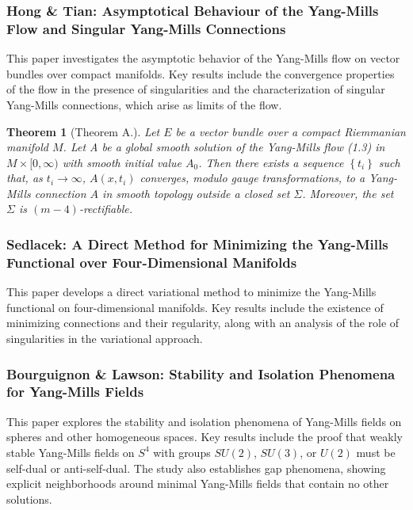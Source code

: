 \documentclass[10pt, letterpaper]{article}
\theoremstyle{custom}
\newtheorem{theorem}{Theorem}[section]
\theoremstyle{definition}
\begin{document}
\subsubsection{Hong \& Tian: Asymptotical Behaviour of the Yang-Mills Flow and Singular Yang-Mills Connections \cite{hongtian2004yangmills}} 
This paper investigates the asymptotic behavior of the Yang-Mills flow on vector bundles over compact manifolds. Key results include the convergence properties of the flow in the presence of singularities and the characterization of singular Yang-Mills connections, which arise as limits of the flow.


\begin{theorem}[Theorem A.]
    Let $E$ be a vector bundle over a compact Riemmanian manifold $M$. Let A be a global smooth solution of the Yang-Mills flow (1.3) in $M \times[0, \infty)$ with smooth initial value $A_0$. Then there exists a sequence $\left\{t_i\right\}$ such that, as $t_i \rightarrow \infty$, $A\left(x, t_i\right)$ converges, modulo gauge transformations, to a Yang-Mills connection $A$ in smooth topology outside a closed set $\Sigma$. Moreover, the set $\Sigma$ is $(m-4)$-rectifiable.
\end{theorem}



\subsubsection{Sedlacek: A Direct Method for Minimizing the Yang-Mills Functional over Four-Dimensional Manifolds \cite{sedlacek1982direct}} 
This paper develops a direct variational method to minimize the Yang-Mills functional on four-dimensional manifolds. Key results include the existence of minimizing connections and their regularity, along with an analysis of the role of singularities in the variational approach.


\subsubsection{Bourguignon \& Lawson: Stability and Isolation Phenomena for Yang-Mills Fields \cite{bourguignon1981stability}} 
This paper explores the stability and isolation phenomena of Yang-Mills fields on spheres and other homogeneous spaces. Key results include the proof that weakly stable Yang-Mills fields on \( S^4 \) with groups \( SU(2) \), \( SU(3) \), or \( U(2) \) must be self-dual or anti-self-dual. The study also establishes gap phenomena, showing explicit neighborhoods around minimal Yang-Mills fields that contain no other solutions.
\end{document}
